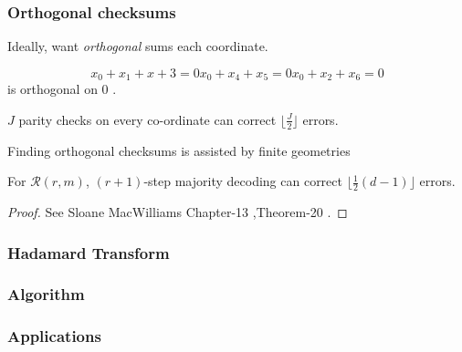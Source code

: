 \documentclass{beamer}
\newcommand{\RM}[2]{\ensuremath{\mathcal{R}(#1,#2)}}
\newcommand{\slm}{Sloane MacWilliams}
\begin{document}
\begin{frame}
\frametitle{Orthogonal checksums}
Ideally, want \emph{orthogonal} sums each coordinate.

\begin{equation*}
x_0 + x_1 + x+3 = 0
x_0 + x_4 + x_5 = 0
x_0 + x_2 + x_6 = 0
\end{equation*}
 is orthogonal on $0$ .


\begin{thm} 
$J$ parity checks on every co-ordinate can correct $\lfloor\frac{J}{2}\rfloor$ errors.
\end{thm}

Finding orthogonal checksums is assisted by finite geometries

\begin{thm}
  For $\RM{r}{m}$, $(r+1)$-step majority decoding can correct $\lfloor \frac{1}{2}(d-1) \rfloor$ errors.
  \begin{proof}
    See \slm{} \cite{sloane} Chapter-13 ,Theorem-20 .
  \end{proof}
\end{thm}

\end{frame}






\begin{frame}
\frametitle{Hadamard Transform}


\end{frame}



\begin{frame}
\frametitle{Algorithm} 

\end{frame}



\begin{frame}
\frametitle{Applications} 

\end{frame}

\end{document}
